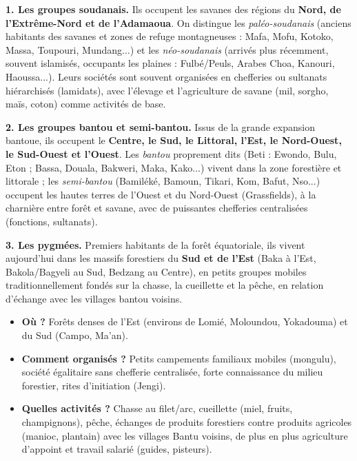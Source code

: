 \documentclass[11pt]{article}
\begin{document}
\textbf{1. Les groupes soudanais.} Ils occupent les savanes des régions du \textbf{Nord, de l'Extrême-Nord et de l'Adamaoua}. On distingue les \emph{paléo-soudanais} (anciens habitants des savanes et zones de refuge montagneuses : Mafa, Mofu, Kotoko, Massa, Toupouri, Mundang...) et les \emph{néo-soudanais} (arrivés plus récemment, souvent islamisés, occupants les plaines : Fulbé/Peuls, Arabes Choa, Kanouri, Haoussa...). Leurs sociétés sont souvent organisées en chefferies ou sultanats hiérarchisés (lamidats), avec l'élevage et l'agriculture de savane (mil, sorgho, maïs, coton) comme activités de base.

\textbf{2. Les groupes bantou et semi-bantou.} Issus de la grande expansion bantoue, ils occupent le \textbf{Centre, le Sud, le Littoral, l'Est, le Nord-Ouest, le Sud-Ouest et l'Ouest}. Les \emph{bantou} proprement dits (Beti : Ewondo, Bulu, Eton ; Bassa, Douala, Bakweri, Maka, Kako...) vivent dans la zone forestière et littorale ; les \emph{semi-bantou} (Bamiléké, Bamoun, Tikari, Kom, Bafut, Nso...) occupent les hautes terres de l'Ouest et du Nord-Ouest (Grassfields), à la charnière entre forêt et savane, avec de puissantes chefferies centralisées (fonctions, sultanats).

\textbf{3. Les pygmées.} Premiers habitants de la forêt équatoriale, ils vivent aujourd'hui dans les massifs forestiers du \textbf{Sud et de l'Est} (Baka à l'Est, Bakola/Bagyeli au Sud, Bedzang au Centre), en petits groupes mobiles traditionnellement fondés sur la chasse, la cueillette et la pêche, en relation d'échange avec les villages bantou voisins.

\begin{exemplebox}
\begin{itemize}
\item \textbf{Où ?} Forêts denses de l'Est (environs de Lomié, Moloundou, Yokadouma) et du Sud (Campo, Ma'an).
\item \textbf{Comment organisés ?} Petits campements familiaux mobiles (mongulu), société égalitaire sans chefferie centralisée, forte connaissance du milieu forestier, rites d'initiation (Jengi).
\item \textbf{Quelles activités ?} Chasse au filet/arc, cueillette (miel, fruits, champignons), pêche, échanges de produits forestiers contre produits agricoles (manioc, plantain) avec les villages Bantu voisins, de plus en plus agriculture d'appoint et travail salarié (guides, pisteurs).
\end{itemize}
\end{exemplebox}
\end{document}
